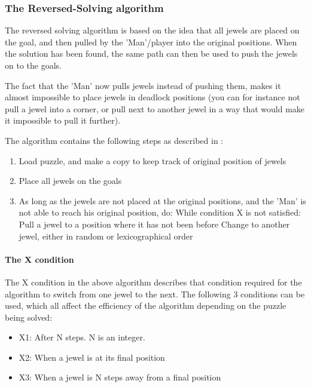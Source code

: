 \subsubsection{The Reversed-Solving algorithm}
The reversed solving algorithm is based on the idea that all jewels are placed on the goal, and then pulled by the 'Man'/player into the original positions. When the solution has been found, the same path can then be used to push the jewels on to the goals.

The fact that the 'Man' now pulls jewels instead of pushing them, makes it almost impossible to place jewels in deadlock positions (you can for instance not pull a jewel into a corner, or pull next to another jewel in a way that would make it impossible to pull it further).

The algorithm contains the following steps as described in \cite{franktakes}:

\begin{enumerate}
\item Load puzzle, and make a copy to keep track of original position of jewels
\item Place all jewels on the goals
\item As long as the jewels are not placed at the original positions, and the 'Man' is not able to reach his original position, do:
\subitem While condition X is not satisfied:
\subsubitem Pull a jewel to a position where it has not been before
\subitem Change to another jewel, either in random or lexicographical order
\end{enumerate}

\paragraph{The X condition}
The X condition in the above algorithm describes that condition required for the algorithm to switch from one jewel to the next. The following 3 conditions can be used, which all affect the efficiency of the algorithm depending on the puzzle being solved:

\begin{itemize}
\item X1: After N steps. N is an integer.
\item X2: When a jewel is at its final position
\item X3: When a jewel is N steps away from a final position
\end{itemize}

